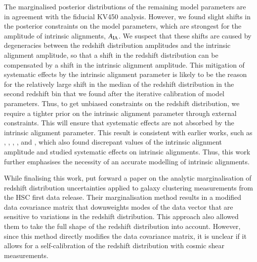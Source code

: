 \documentclass{aa}
\begin{document}
The marginalised posterior distributions of the remaining model parameters are in agreement with the fiducial KV450 analysis. However, we found slight shifts in the posterior constraints on the model parameters, which are strongest for the amplitude of intrinsic alignments, $A_{\rm IA}$. We suspect that these shifts are caused by degeneracies between the redshift distribution amplitudes and the intrinsic alignment amplitude, so that a shift in the redshift distribution can be compensated by a shift in the intrinsic alignment amplitude. This mitigation of systematic effects by the intrinsic alignment parameter is likely to be the reason for the relatively large shift in the median of the redshift distribution in the second redshift bin that we found after the iterative calibration of model parameters. Thus, to get unbiased constraints on the redshift distribution, we require a tighter prior on the intrinsic alignment parameter through external constraints. This will ensure that systematic effects are not absorbed by the intrinsic alignment parameter. This result is consistent with earlier works, such as \cite{wright_som_kv450}, \cite{hildebrandt18}, \cite{fortuna20}, \cite{vanUitert18}, and \cite{Efstathiou18}, which also found discrepant values of the intrinsic alignment amplitude and studied systematic effects on intrinsic alignments. Thus, this work further emphasises the necessity of an accurate modelling of intrinsic alignments.

While finalising this work, \cite{Hadzhiyska20} put forward a paper on the analytic marginalisation of redshift distribution uncertainties applied to galaxy clustering measurements from the HSC first data release. Their marginalisation method results in a modified data covariance matrix that downweights modes of the data vector that are sensitive to variations in the redshift distribution. This approach also allowed them to take the full shape of the redshift distribution into account. However, since this method directly modifies the data covariance matrix, it is unclear if it allows for a self-calibration of the redshift distribution with cosmic shear measurements. 
\end{document}
